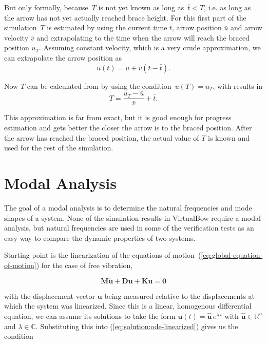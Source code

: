 But only formally, because~$T$ is not yet known as long as~$\overline{t} < T$, i.e. as long as the arrow has not yet actually reached brace height.
For this first part of the simulation~$T$ is estimated by using the current time $\overline{t}$, arrow position $\overline{u}$ and arrow velocity $\overline{v}$ and extrapolating to the time when the arrow will reach the braced position $u_T$.
Assuming constant velocity, which is a very crude approximation, we can extrapolate the arrow position as
\begin{equation}
u(t) = \bar{u} + \bar{v}(t - \bar{t}).\label{eq:solution:progress:ansatz}
\end{equation}

Now $T$ can be calculated from by using the condition~$u(T) = u_T$, with results in
\begin{equation}
T = \frac{u_T - \bar{u}}{\bar{v}} + \bar{t}.
\end{equation}

This approximation is far from exact, but it is good enough for progress estimation and gets better the closer the arrow is to the braced position.
After the arrow has reached the braced position, the actual value of $T$ is known and used for the rest of the simulation.

\newpage
\section{Modal Analysis}

The goal of a modal analysis is to determine the natural frequencies and mode shapes of a system.
None of the simulation results in VirtualBow require a modal analysis, but natural frequencies are used in some of the verification tests as an easy way to compare the dynamic properties of two systems.

Starting point is the linearization of the equations of motion~(\ref{eq:global-equation-of-motion}) for the case of free vibration,

\begin{equation}
\boldsymbol{M}\ddot{\boldsymbol{u}} + \boldsymbol{D}\dot{\boldsymbol{u}} + \boldsymbol{K}\boldsymbol{u} = \boldsymbol{0} \label{eq:solution:ode-linearized}
\end{equation}

with the displacement vector $\boldsymbol{u}$ being measured relative to the displacements at which the system was linearized.
Since this is a linear, homogenous differential equation, we can assume its solutions to take the form $\boldsymbol{u}(t) = \hat{\boldsymbol{u}}\,e^{\lambda\,t}$ with $\hat{\boldsymbol{u}} \in \mathbb{R}^n$ and $\lambda \in \mathbb{C}$. Substituting this into (\ref{eq:solution:ode-linearized}) gives us the condition

